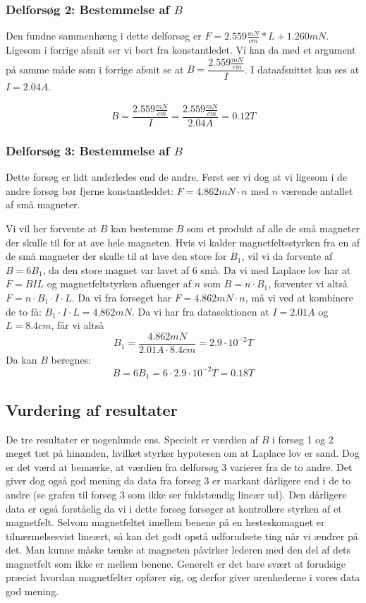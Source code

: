 \documentclass[10pt,a4paper]{article}
\theoremstyle{break}
\theoremstyle{nonumberplain}
\begin{document}
\subsubsection{Delforsøg 2: Bestemmelse af $B$}
Den fundne sammenhæng i dette delforsøg er $F = 2.559\frac{mN}{cm}*L + 1.260mN$.
Ligesom i forrige afsnit ser vi bort fra konstantledet.
Vi kan da med et argument på samme måde som i forrige afsnit se at $B=\dfrac{2.559\frac{mN}{cm}}{I}$. 
I dataafsnittet kan ses at $I=2.04A$.

$$B = \dfrac{2.559\frac{mN}{cm}}{I}  = \dfrac{2.559\frac{mN}{cm}}{2.04A} = 0.12T$$

\subsubsection{Delforsøg 3: Bestemmelse af $B$}
Dette forsøg er lidt anderledes end de andre.
Først ser vi dog at vi ligesom i de andre forsøg bør fjerne konstantleddet: $F = 4.862mN\cdot n$ med $n$ værende antallet af små magneter. 
 
Vi vil her forvente at $B$ kan bestemme $B$ som et produkt af alle de små magneter der skulle til for at ave hele magneten. 
Hvis vi kalder magnetfeltsstyrken fra en af de små magneter der skulle til at lave den store for $B_1$, vil vi da forvente af $B=6B_1$, da den store magnet var lavet af $6$ små.
Da vi med Laplace lov har at $F=BIL$ og magnetfeltstyrken afhænger af $n$ som $B=n\cdot B_1$, forventer vi altså $F=n\cdot B_1 \cdot I \cdot L$.
Da vi fra forsøget har $F=4.862mN\cdot n$, må vi ved at kombinere de to få: 
$B_1 \cdot I \cdot L = 4.862mN$.
Da vi har fra datasektionen at $I=2.01A$ og $L=8.4cm$, får vi altså 
$$B_1 = \dfrac{4.862mN}{2.01 A\cdot 8.4 cm}=2.9\cdot 10^{-2}T$$
Da kan $B$ beregnes:
$$B = 6 B_1 = 6\cdot 2.9\cdot 10^{-2}T=0.18T$$

\subsection{Vurdering af resultater}
De tre resultater er nogenlunde ens. 
Specielt er værdien af $B$ i forsøg 1 og 2 meget tæt på hinanden, hvilket styrker hypotesen om at Laplace lov er sand. 
Dog er det værd at bemærke, at værdien fra delforsøg 3 varierer fra de to andre.
Det giver dog også god mening da data fra forsøg 3 er markant dårligere end i de to andre (se grafen til forsøg 3 som ikke ser fuldstændig lineær ud). 
Den dårligere data er også forståelig da vi i dette forsøg forsøger at kontrollere styrken af et magnetfelt. 
Selvom magnetfeltet imellem benene på en hesteskomagnet er tilnærmelsesvist lineært, så kan det godt opstå udforudsete ting når vi ændrer på det. 
Man kunne måske tænke at magneten påvirker lederen med den del af dets magnetfelt som ikke er mellem benene. 
Generelt er det bare svært at forudsige præcist hvordan magnetfelter opfører sig, og derfor giver urenhederne i vores data god mening. 
\end{document}
